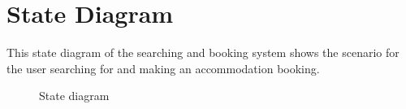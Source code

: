 \documentclass[a4paper]{article}
\begin{document}
\section{State Diagram}

This state diagram of the searching and booking system shows the scenario for the user searching for and making an accommodation booking.

\begin{figure}[h!]
	\centering
	\caption{State diagram}
\end{figure}
\clearpage
\end{document}

